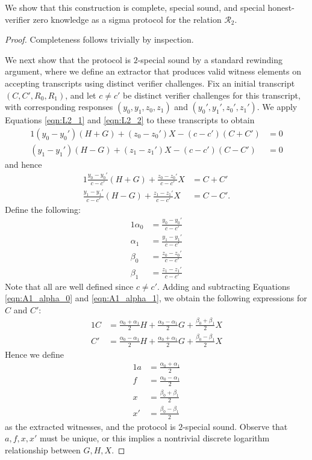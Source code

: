 \documentclass{article}
\begin{document}
We show that this construction is complete, special sound, and special honest-verifier zero knowledge as a sigma protocol for the relation $\mathcal{R}_2$.

\begin{proof}
	Completeness follows trivially by inspection.

	We next show that the protocol is $2$-special sound by a standard rewinding argument, where we define an extractor that produces valid witness elements on accepting transcripts using distinct verifier challenges.
	Fix an initial transcript $(C,C',R_0,R_1)$, and let $c \neq c'$ be distinct verifier challenges for this transcript, with corresponding responses $(y_0,y_1,z_0,z_1)$ and $(y_0',y_1',z_0',z_1')$.
	We apply Equations \ref{eqn:L2_1} and \ref{eqn:L2_2} to these transcripts to obtain
	\begin{alignat*}{1}
		(y_0 - y_0')(H + G) + (z_0 - z_0')X - (c - c')(C + C') &= 0 \\
		(y_1 - y_1')(H - G) + (z_1 - z_1')X - (c - c')(C - C') &= 0
	\end{alignat*}
	and hence
	\begin{alignat}{1}
		\frac{y_0 - y_0'}{c - c'} (H + G) + \frac{z_0 - z_0'}{c - c'} X &= C + C'	\label{eqn:A1_alpha_0} \\	
		\frac{y_1 - y_1'}{c - c'} (H - G) + \frac{z_1 - z_1'}{c - c'} X &= C - C'. \label{eqn:A1_alpha_1}
	\end{alignat}
	Define the following:
	\begin{alignat*}{1}
		\alpha_0 &= \frac{y_0 - y_0'}{c - c'} \\
		\alpha_1 &= \frac{y_1 - y_1'}{c - c'} \\
		\beta_0 &= \frac{z_0 - z_0'}{c - c'} \\
		\beta_1 &= \frac{z_1 - z_1'}{c - c'}
	\end{alignat*}
	Note that all are well defined since $c \neq c'$.
	Adding and subtracting Equations \ref{eqn:A1_alpha_0} and \ref{eqn:A1_alpha_1}, we obtain the following expressions for $C$ and $C'$:
	\begin{alignat*}{1}
		C &= \frac{\alpha_0 + \alpha_1}{2} H + \frac{\alpha_0 - \alpha_1}{2} G + \frac{\beta_0 + \beta_1}{2} X \\
		C' &= \frac{\alpha_0 - \alpha_1}{2} H + \frac{\alpha_0 + \alpha_1}{2} G + \frac{\beta_0 - \beta_1}{2} X
	\end{alignat*}
	Hence we define
	\begin{alignat*}{1}
		a &= \frac{\alpha_0 + \alpha_1}{2} \\
		f &= \frac{\alpha_0 - \alpha_1}{2} \\
		x &= \frac{\beta_0 + \beta_1}{2} \\
		x' &= \frac{\beta_0 - \beta_1}{2}
	\end{alignat*}
	as the extracted witnesses, and the protocol is $2$-special sound.
	Observe that $a,f,x,x'$ must be unique, or this implies a nontrivial discrete logarithm relationship between $G,H,X$.


\end{proof}
\end{document}

